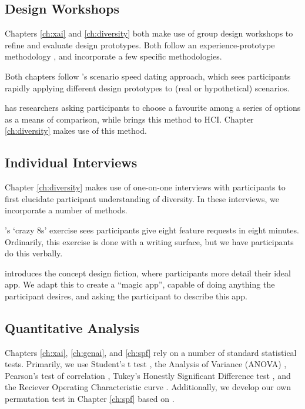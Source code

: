 \subsection{Design Workshops}
Chapters \ref{ch:xai} and \ref{ch:diversity} both make use of group design workshops to refine and evaluate design prototypes. Both follow an experience-prototype methodology \cite{Buchenau_Suri_2000}, and incorporate a few specific methodologies.

Both chapters follow \textcite{Zimmerman_Forlizzi_2017}'s scenario speed dating approach, which sees participants rapidly applying different design prototypes to (real or hypothetical) scenarios.

\textcite{Gatian_1994} has researchers asking participants to choose a favourite among a series of options as a means of comparison, while \textcite{Griffiths_Johnson_Hartley_2007} brings this method to HCI. Chapter \ref{ch:diversity} makes use of this method.

\subsection{Individual Interviews}
Chapter \ref{ch:diversity} makes use of one-on-one interviews with participants to first elucidate participant understanding of diversity. In these interviews, we incorporate a number of methods.

\textcite{Knapp_Zeratzky_Kowitz_2016}'s `crazy 8s' exercise sees participants give eight feature requests in eight minutes. Ordinarily, this exercise is done with a writing surface, but we have participants do this verbally.

\textcite{blythe2014research} introduces the concept design fiction, where participants more detail their ideal app. We adapt this to create a ``magic app'', capable of doing anything the participant desires, and asking the participant to describe this app.

\subsection{Quantitative Analysis}
Chapters \ref{ch:xai}, \ref{ch:genai}, and \ref{ch:spf} rely on a number of standard statistical tests. Primarily, we use Student's t test \cite{Mishra_Singh_Pandey_Mishra_Pandey_2019}, the Analysis of Variance (ANOVA) \cite{Mishra_Singh_Pandey_Mishra_Pandey_2019}, Pearson's test of correlation \cite{Schober_Boer_Schwarte_2018}, Tukey's Honestly Significant Difference test \cite{Kim_2015}, and the Reciever Operating Characteristic curve \cite{hanley1989receiver}. Additionally, we develop our own permutation test in Chapter \ref{ch:spf} based on \textcite{good2013permutation}.

